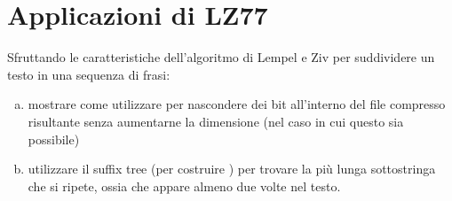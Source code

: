 \chapter{Applicazioni di LZ77}

\begin{problem*}
  Sfruttando le caratteristiche dell'algoritmo \LZuno di Lempel e Ziv per
  suddividere un testo in una sequenza di frasi:
  \begin{enumerate}[(a)]
    \item mostrare come utilizzare \LZuno per nascondere dei bit all'interno 
    del file compresso risultante senza aumentarne la dimensione (nel caso
    in cui questo sia possibile)
    \item utilizzare il suffix tree (per costruire \LZuno) per trovare la pi\`u 
    lunga sottostringa che si ripete, ossia che appare almeno due volte nel 
    testo.
  \end{enumerate}
\end{problem*}

